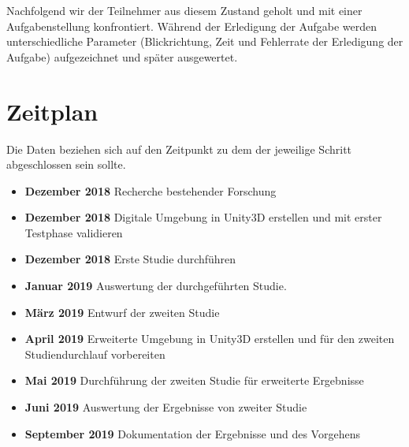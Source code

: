 \documentclass[a4paper, 11pt]{article}
\begin{document}
Nachfolgend wir der Teilnehmer aus diesem Zustand geholt und mit einer Aufgabenstellung konfrontiert. Während der Erledigung der Aufgabe werden unterschiedliche Parameter (Blickrichtung, Zeit und Fehlerrate der Erledigung der Aufgabe) aufgezeichnet und später ausgewertet.

\section*{Zeitplan}
Die Daten beziehen sich auf den Zeitpunkt zu dem der jeweilige Schritt abgeschlossen sein sollte.
\begin{itemize}
    \item \textbf{Dezember 2018} Recherche bestehender Forschung
    \item \textbf{Dezember 2018} Digitale Umgebung in Unity3D erstellen und mit erster Testphase validieren
    \item \textbf{Dezember 2018} Erste Studie durchführen
    \item \textbf{Januar 2019} Auswertung der durchgeführten Studie.
    \item \textbf{März 2019} Entwurf der zweiten Studie
    \item \textbf{April 2019} Erweiterte Umgebung in Unity3D erstellen und für den zweiten Studiendurchlauf vorbereiten
    \item \textbf{Mai 2019} Durchführung der zweiten Studie für erweiterte Ergebnisse
    \item \textbf{Juni 2019} Auswertung der Ergebnisse von zweiter Studie
    \item \textbf{September 2019} Dokumentation der Ergebnisse und des Vorgehens
\end{itemize}
\end{document}
